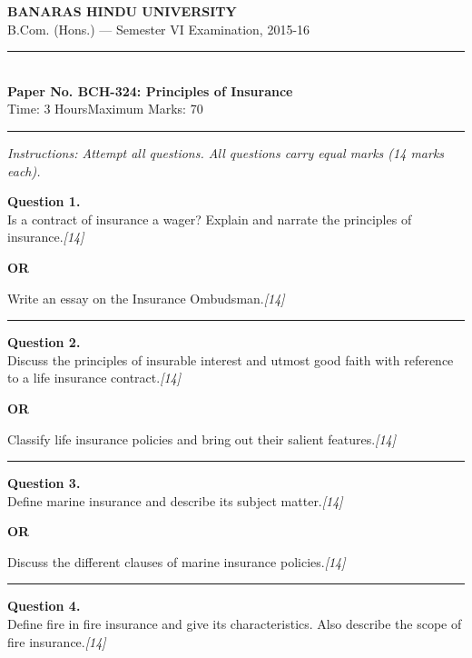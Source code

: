 \documentclass[11pt,a4paper]{article}
\newcommand{\pts}[1]{\hfill   \textit{[#1]}}
\begin{document}
\begin{center}
  {\large\bfseries BANARAS HINDU UNIVERSITY}\\[2pt]
  {\normalsize B.Com. (Hons.) --- Semester VI Examination, 2015-16}\\[6pt]
  \rule{0.8\linewidth}{0.5pt}\\[6pt]
  {\large\bfseries Paper No. BCH-324: Principles of Insurance}\\[4pt]
  {\normalsize Time: 3 Hours\hfill Maximum Marks: 70}
\end{center}

\rule{\linewidth}{0.4pt}

\smallskip



\noindent   \textit{Instructions: Attempt all questions. All questions carry equal marks (14 marks each).}

\bigskip




\noindent   \textbf{Question 1.} \\
Is a contract of insurance a wager? Explain and narrate the principles of insurance.\pts{14}

\centerline{   \textbf{OR}}

Write an essay on the Insurance Ombudsman.\pts{14}

\medskip\rule{\linewidth}{0.2pt}




\noindent   \textbf{Question 2.} \\
Discuss the principles of insurable interest and utmost good faith with reference to a life insurance contract.\pts{14}

\centerline{   \textbf{OR}}

Classify life insurance policies and bring out their salient features.\pts{14}

\medskip\rule{\linewidth}{0.2pt}

\pagebreak




\noindent   \textbf{Question 3.} \\
Define marine insurance and describe its subject matter.\pts{14}

\centerline{   \textbf{OR}}

Discuss the different clauses of marine insurance policies.\pts{14}

\medskip\rule{\linewidth}{0.2pt}




\noindent   \textbf{Question 4.} \\
Define fire in fire insurance and give its characteristics. Also describe the scope of fire insurance.\pts{14}
\end{document}
